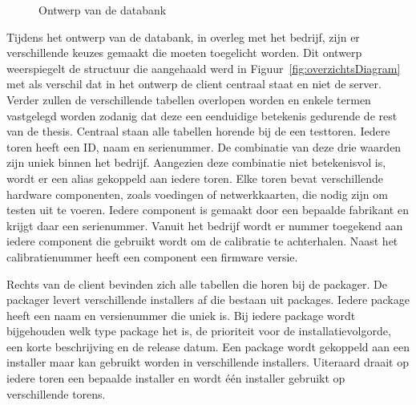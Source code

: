 \begin{figure}[!ht]
\centering
{}
\caption{Ontwerp van de databank}
\label{fig:databank}
\end{figure}

Tijdens het ontwerp van de databank, in overleg met het bedrijf, zijn er verschillende keuzes gemaakt die moeten toegelicht worden.
Dit ontwerp weerspiegelt de structuur die aangehaald werd in Figuur~\vref{fig:overzichtsDiagram} met als verschil dat in het ontwerp de client centraal staat en niet de server.
Verder zullen de verschillende tabellen overlopen worden en enkele termen vastgelegd worden zodanig dat deze een eenduidige betekenis gedurende de rest van de thesis.
Centraal staan alle tabellen horende bij de een testtoren.
Iedere toren heeft een ID, naam en serienummer. 
De combinatie van deze drie waarden zijn uniek binnen het bedrijf.
Aangezien deze combinatie niet betekenisvol is, wordt er een alias gekoppeld aan iedere toren.
Elke toren bevat verschillende hardware componenten, zoals voedingen of netwerkkaarten, die nodig zijn om testen uit te voeren.
Iedere component is gemaakt door een bepaalde fabrikant en krijgt daar een serienummer.
Vanuit het bedrijf wordt er nummer toegekend aan iedere component die gebruikt wordt om de calibratie te achterhalen.
Naast het calibratienummer heeft een component een firmware versie.

Rechts van de client bevinden zich alle tabellen die horen bij de packager.
De packager levert verschillende installers af die bestaan uit packages.
Iedere package heeft een naam en versienummer die uniek is.
Bij iedere package wordt bijgehouden welk type package het is, de prioriteit voor de installatievolgorde, een korte beschrijving en de release datum.
Een package wordt gekoppeld aan een installer maar kan gebruikt worden in verschillende installers.
Uiteraard draait op iedere toren een bepaalde installer en wordt één installer gebruikt op verschillende torens.

